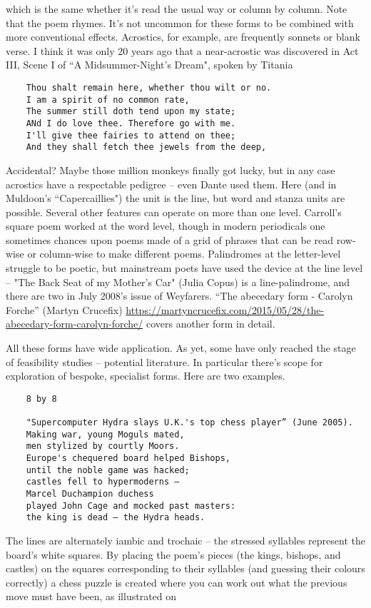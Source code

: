\documentclass[11pt]{article}
\begin{document}
which is the same whether it's read the usual way or column by column. Note that the poem rhymes. It’s not uncommon for these forms to be combined with more conventional effects. Acrostics, for example, are frequently sonnets or blank verse. I think it was only 20 years ago that a near-acrostic was discovered in Act III, Scene I of “A Midsummer-Night's Dream", spoken by Titania
\begin{verbatim}
    Thou shalt remain here, whether thou wilt or no.
    I am a spirit of no common rate,
    The summer still doth tend upon my state;
    ANd I do love thee. Therefore go with me.
    I'll give thee fairies to attend on thee;
    And they shall fetch thee jewels from the deep,
\end{verbatim}
Accidental? Maybe those million monkeys finally got lucky, but in any case acrostics have a respectable pedigree – even Dante used them. Here (and in Muldoon's “Capercaillies") the unit is the line, but word and stanza units are possible. Several other features can operate on more than one level. Carroll's square poem worked at the word level, though in modern periodicals one sometimes chances upon poems made of a grid of phrases that can be read row-wise or column-wise to make different poems. Palindromes at the letter-level struggle to be poetic, but mainstream poets have used the device at the line level – "The Back Seat of my Mother's Car" (Julia Copus) is a line-palindrome, and there are two in July 2008's issue of Weyfarers. ``The abecedary form - Carolyn Forche'' (Martyn Crucefix) \url{https://martyncrucefix.com/2015/05/28/the-abecedary-form-carolyn-forche/} covers another form in detail.

All these forms have wide application. As yet, some have only reached the stage of feasibility studies – potential literature. In particular there’s scope for exploration of bespoke, specialist forms. Here are two examples.
\begin{verbatim}
    8 by 8

    "Supercomputer Hydra slays U.K.'s top chess player” (June 2005).
    Making war, young Moguls mated,
    men stylized by courtly Moors.
    Europe's chequered board helped Bishops,
    until the noble game was hacked;
    castles fell to hypermoderns –
    Marcel Duchampion duchess
    played John Cage and mocked past masters:
    the king is dead – the Hydra heads.
\end{verbatim}
The lines are alternately iambic and trochaic – the stressed syllables represent the board’s white squares. By placing the poem's pieces (the kings, bishops, and castles) on the squares corresponding to their syllables (and guessing their colours correctly) a chess puzzle is created where you can work out what the previous move must have been, as illustrated on
\end{document}
